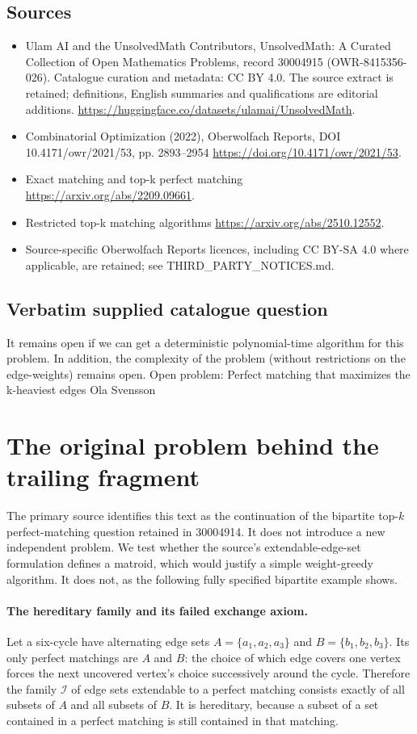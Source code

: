 \documentclass[11pt]{article}
\begin{document}
\subsection{Sources}
\begin{itemize}
\item[S1] Ulam AI and the UnsolvedMath Contributors, UnsolvedMath: A Curated Collection of Open Mathematics Problems, record 30004915 (OWR-8415356-026). Catalogue curation and metadata: CC BY 4.0. The source extract is retained; definitions, English summaries and qualifications are editorial additions.
\url{https://huggingface.co/datasets/ulamai/UnsolvedMath}.
\item[S2] Combinatorial Optimization (2022), Oberwolfach Reports, DOI 10.4171/owr/2021/53, pp. 2893--2954
\url{https://doi.org/10.4171/owr/2021/53}.
\item[S3] Exact matching and top-k perfect matching
\url{https://arxiv.org/abs/2209.09661}.
\item[S4] Restricted top-k matching algorithms
\url{https://arxiv.org/abs/2510.12552}.
\item Source-specific Oberwolfach Reports licences, including CC BY-SA 4.0 where applicable, are retained; see THIRD\_PARTY\_NOTICES.md.
\end{itemize}
\subsection{Verbatim supplied catalogue question}
It remains open if we can get a deterministic polynomial-time algorithm for this problem. In addition, the complexity of the problem (without restrictions on the edge-weights) remains open. Open problem: Perfect matching that maximizes the k-heaviest edges Ola Svensson

\section{The original problem behind the trailing fragment}
The primary source identifies this text as the continuation of
the bipartite top-$k$ perfect-matching question retained in
30004914. It does not introduce a new independent problem.
We test whether the source's extendable-edge-set formulation defines
a matroid, which would justify a simple weight-greedy algorithm.
It does not, as the following fully specified bipartite example shows.

\paragraph{The hereditary family and its failed exchange axiom.}
Let a six-cycle have alternating edge sets
$A=\{a_1,a_2,a_3\}$ and $B=\{b_1,b_2,b_3\}$.
Its only perfect matchings are $A$ and $B$: the choice of
which edge covers one vertex forces the next uncovered vertex's
choice successively around the cycle. Therefore the family
$\mathcal I$ of edge sets extendable to a perfect matching
consists exactly of all subsets of $A$ and all subsets of
$B$. It is hereditary, because a subset of a set contained
in a perfect matching is still contained in that matching.
\end{document}
